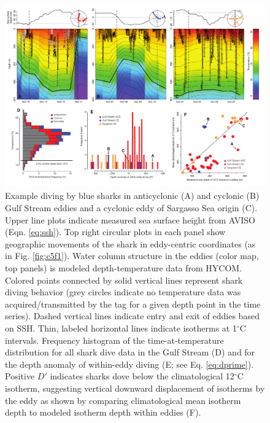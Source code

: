 \begin{figure}[htbp]
\centering
\includegraphics[width=\textwidth]{images/C5_Fig3.pdf}
\caption[Example diving by blue sharks in Gulf Stream eddies and a Sargasso Sea cyclone]{Example diving by blue sharks in anticyclonic (A) and cyclonic (B) Gulf Stream eddies and a cyclonic eddy of Sargasso Sea origin (C). Upper line plots indicate measured sea surface height from AVISO (Eqn. \ref{eq:ssh}). Top right circular plots in each panel show geographic movements of the shark in eddy-centric coordinates (as in Fig. \ref{fig:c5f1}). Water column structure in the eddies (color map, top panels) is modeled depth-temperature data from HYCOM. Colored points connected by solid vertical lines represent shark diving behavior (grey circles indicate no temperature data was acquired/transmitted by the tag for a given depth point in the time series). Dashed vertical lines indicate entry and exit of eddies based on SSH. Thin, labeled horizontal lines indicate isotherms at 1$^\circ$C intervals. Frequency histogram of the time-at-temperature distribution for all shark dive data in the Gulf Stream (D) and for the depth anomaly of within-eddy diving (E; see Eq. \ref{eq:dprime}). Positive $D'$ indicates sharks dove below the climatological 12$^\circ$C isotherm, suggesting vertical downward displacement of isotherms by the eddy as shown by comparing climatological mean isotherm depth to \is modeled isotherm depth within eddies (F).}
\label{fig:c5f3}
\end{figure}


